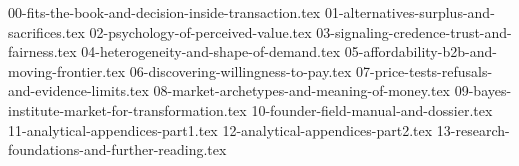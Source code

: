 
{00-fits-the-book-and-decision-inside-transaction.tex}
{01-alternatives-surplus-and-sacrifices.tex}
{02-psychology-of-perceived-value.tex}
{03-signaling-credence-trust-and-fairness.tex}
{04-heterogeneity-and-shape-of-demand.tex}
{05-affordability-b2b-and-moving-frontier.tex}
{06-discovering-willingness-to-pay.tex}
{07-price-tests-refusals-and-evidence-limits.tex}
{08-market-archetypes-and-meaning-of-money.tex}
{09-bayes-institute-market-for-transformation.tex}
{10-founder-field-manual-and-dossier.tex}
{11-analytical-appendices-part1.tex}
{12-analytical-appendices-part2.tex}
{13-research-foundations-and-further-reading.tex}
